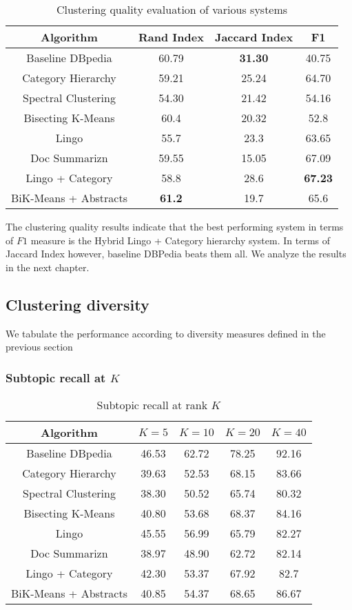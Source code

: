 \documentclass[a4paper,12pt]{report}
\begin{document}
\begin{table}[h]
\centering
\begin{tabular} {|c | c | c | c|}
  \hline
  Algorithm & Rand Index & Jaccard Index  & F1 \\
  \hline
  Baseline DBpedia & 60.79 & {\bf 31.30} & 40.75 \\
  Category Hierarchy & 59.21 & 25.24 & 64.70 \\
  Spectral Clustering & 54.30 & 21.42 & 54.16 \\
  \hline
  Bisecting K-Means & 60.4 & 20.32 & 52.8 \\
  Lingo & 55.7 & 23.3 & 63.65 \\
  Doc Summarizn & 59.55 & 15.05 & 67.09 \\
  \hline
  Lingo + Category & 58.8 & 28.6 & {\bf 67.23} \\
  BiK-Means + Abstracts & {\bf 61.2} & 19.7 & 65.6 \\
  \hline
\end{tabular}
\caption{Clustering quality evaluation of various systems}
\end{table}

The clustering quality results indicate that the best performing
system in terms of $F1$ measure is the Hybrid Lingo + Category
hierarchy system. In terms of Jaccard Index however, baseline DBPedia
beats them all. We analyze the results in the next chapter.

\subsection{Clustering diversity}
We tabulate the performance according to diversity measures defined in
the previous section
\subsubsection{Subtopic recall at $K$}

\begin{table}[h]
\centering
\begin{tabular} {|c | c | c | c|c|}
  \hline
  Algorithm & $K = 5$ & $K = 10$  & $K = 20$ & $K = 40$ \\
  \hline
  Baseline DBpedia & 46.53 & 62.72 & 78.25 & 92.16 \\
  Category Hierarchy & 39.63 & 52.53 & 68.15 & 83.66 \\
  Spectral Clustering & 38.30 & 50.52 & 65.74 & 80.32 \\
  \hline
  Bisecting K-Means & 40.80 & 53.68 & 68.37 & 84.16 \\
  Lingo & 45.55 & 56.99 & 65.79 & 82.27 \\
  Doc Summarizn & 38.97 & 48.90 & 62.72 & 82.14 \\
  \hline
  Lingo + Category & 42.30 & 53.37 & 67.92 & 82.7 \\
  BiK-Means + Abstracts & 40.85 & 54.37 & 68.65 & 86.67 \\
  \hline
\end{tabular}
\caption{Subtopic recall at rank $K$}
\end{table}
\end{document}
